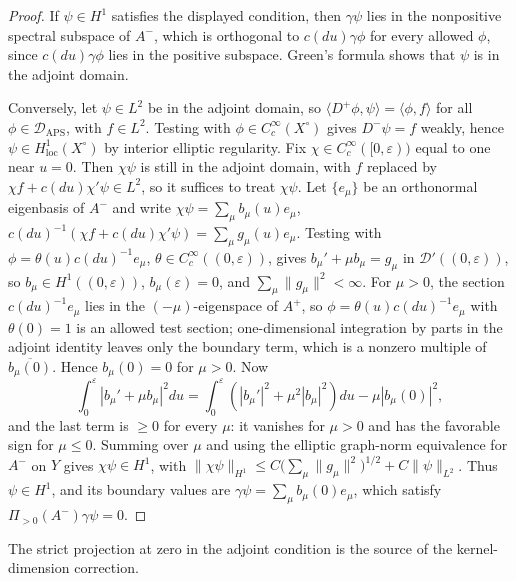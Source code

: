 \documentclass[12pt,oneside,reqno]{article}
\theoremstyle{plain}
\theoremstyle{definition}
\theoremstyle{remark}
\begin{document}
\begin{proof}
If \(\psi\in H^1\) satisfies the displayed condition, then \(\gamma\psi\)
lies in the nonpositive spectral subspace of \(A^-\), which is orthogonal
to \(c(du)\gamma\phi\) for every allowed \(\phi\), since \(c(du)\gamma\phi\)
lies in the positive subspace. Green's formula shows that \(\psi\) is in
the adjoint domain.

Conversely, let \(\psi\in L^2\) be in the adjoint domain, so
\(\langle D^+\phi,\psi\rangle=\langle\phi,f\rangle\) for all
\(\phi\in\mathcal D_{\mathrm{APS}}\), with \(f\in L^2\). Testing with
\(\phi\in C_c^\infty(X^\circ)\) gives \(D^-\psi=f\) weakly, hence
\(\psi\in H^1_{\mathrm{loc}}(X^\circ)\) by interior elliptic regularity.
Fix \(\chi\in C_c^\infty([0,\varepsilon))\) equal to one near \(u=0\). Then
\(\chi\psi\) is still in the adjoint domain, with \(f\) replaced by
\(\chi f+c(du)\chi'\psi\in L^2\), so it suffices to treat \(\chi\psi\). Let
\(\{e_\mu\}\) be an orthonormal eigenbasis of \(A^-\) and write
\(\chi\psi=\sum_\mu b_\mu(u)e_\mu\), \(c(du)^{-1}(\chi f+c(du)\chi'\psi)
=\sum_\mu g_\mu(u)e_\mu\). Testing with \(\phi=\theta(u)c(du)^{-1}e_\mu\),
\(\theta\in C_c^\infty((0,\varepsilon))\), gives
\(b_\mu'+\mu b_\mu=g_\mu\) in \(\mathcal D'((0,\varepsilon))\), so
\(b_\mu\in H^1((0,\varepsilon))\), \(b_\mu(\varepsilon)=0\), and
\(\sum_\mu\lVert g_\mu\rVert^2<\infty\). For \(\mu>0\), the section
\(c(du)^{-1}e_\mu\) lies in the \((-\mu)\)-eigenspace of \(A^+\), so
\(\phi=\theta(u)c(du)^{-1}e_\mu\) with \(\theta(0)=1\) is an allowed test
section; one-dimensional integration by parts in the adjoint identity
leaves only the boundary term, which is a nonzero multiple of
\(\overline{b_\mu(0)}\). Hence \(b_\mu(0)=0\) for \(\mu>0\). Now
\[
 \int_0^\varepsilon|b_\mu'+\mu b_\mu|^2du
 =\int_0^\varepsilon(|b_\mu'|^2+\mu^2|b_\mu|^2)du-\mu|b_\mu(0)|^2,
\]
and the last term is \(\geq0\) for every \(\mu\): it vanishes for \(\mu>0\)
and has the favorable sign for \(\mu\leq0\). Summing over \(\mu\) and using
the elliptic graph-norm equivalence for \(A^-\) on \(Y\) gives
\(\chi\psi\in H^1\), with
\(\lVert\chi\psi\rVert_{H^1}\leq C\bigl(\sum_\mu\lVert g_\mu\rVert^2\bigr)^{1/2}
+C\lVert\psi\rVert_{L^2}\). Thus \(\psi\in H^1\), and its boundary values
are \(\gamma\psi=\sum_\mu b_\mu(0)e_\mu\), which satisfy
\(\Pi_{>0}(A^-)\gamma\psi=0\).
\end{proof}

The strict projection at zero in the adjoint condition is the source of
the kernel-dimension correction.
\end{document}
